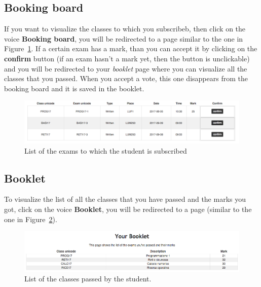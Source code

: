 \subsection{Booking board}
If you want to visualize the classes to which you subscribeb, then click on the voice \textbf{Booking board}, you will be redirected to a page similar to the one in Figure~\ref{fig:studentRecords}.  If a certain exam has a mark, than you can accept it by clicking on the \textbf{confirm} button (if an exam hasn't a mark yet, then the button is unclickable) and you will be redirected to your \emph{booklet} page where you can visualize all the classes that you passed. When you accept a vote, this one disappears from the booking board and it is saved in the booklet.
\begin{figure}[H]
	\centering
	\includegraphics[width=1.0\textwidth]{img/studentRecords.png}
	\caption{List of the exams to which the student is subscribed}
	\label{fig:studentRecords}
\end{figure}

\subsection{Booklet}
To visualize the list of  all the classes that you have passed and the marks you got, click on the voice \textbf{Booklet}, you will be redirected to a page (similar to the one in Figure~\ref{fig:booklet}).
\begin{figure}[H]
	\centering
	\includegraphics[width=1.0\textwidth]{img/booklet.png}
	\caption{List of the classes passed by the student.}
	\label{fig:booklet}
\end{figure}